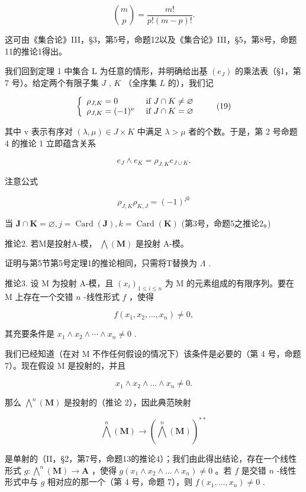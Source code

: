 \[
\binom {m} {p} = \frac {m !}{p ! (m - p) !}.
\]

这可由《集合论》III，§3，第5号，命题12以及《集合论》III，§5，第8号，命题11的推论1得出。

我们回到定理 1 中集合 L 为任意的情形，并明确给出基 \((e_{J})\) 的乘法表（§1，第 7 号）。给定两个有限子集 \(J\) , \(K\) （全序集 \(L\) 的），我们记

\[
\left\{ \begin{array}{l l} \rho_ {J, K} = 0 & \text { if } J \cap K \neq \varnothing \\ \rho_ {J, K} = (- 1) ^ {\nu} & \text { if } J \cap K = \varnothing \end{array} \right.\tag{19}
\]

其中 v 表示有序对 \((\lambda, \mu) \in J \times K\) 中满足 \(\lambda > \mu\) 者的个数。于是，第 2 号命题 4 的推论 1 立即蕴含关系

\[
e _ {J} \wedge e _ {K} = \rho_ {J, K} e _ {J \cup K}.\tag{20}
\]

注意公式

\[
\rho_ {J, K} \rho_ {K, J} = (- 1) ^ {j k}\tag{21}
\]

当 \(\mathbf{J} \cap \mathbf{K} = \varnothing, j = \operatorname{Card}(\mathbf{J}), k = \operatorname{Card}(\mathbf{K})\) (第3号，命题5之推论2。)

推论2. 若M是投射A-模， \(\bigwedge (\mathbf{M})\) 是投射 A-模。

证明与第5节第5号定理1的推论相同，只需将T替换为 \(\Lambda\) .

推论3. 设 M 为投射 A-模，且 \((x_{i})_{1\leqslant i\leqslant n}\) 为 M 的元素组成的有限序列。要在 M 上存在一个交错 \(n\) -线性形式 \(f\) ，使得

\[
f (x _ {1}, x _ {2}, \dots , x _ {n}) \neq 0,
\]

其充要条件是 \(x_{1} \wedge x_{2} \wedge \cdots \wedge x_{n} \neq 0\) .

我们已经知道（在对 M 不作任何假设的情况下）该条件是必要的（第 4 号，命题 7）。现在假设 M 是投射的，并且

\[
x _ {1} \wedge x _ {2} \wedge \dots \wedge x _ {n} \neq 0.
\]

那么 \(\bigwedge^n (\mathbf{M})\) 是投射的（推论 2），因此典范映射

\[
\bigwedge^ {n} (\mathbf {M}) \rightarrow (\bigwedge^ {n} (\mathbf {M})) ^ {* *}
\]

是单射的（II，§2，第7号，命题13的推论4）；我们由此得出结论，存在一个线性形式 \(g: \bigwedge^{n}(\mathbf{M}) \to \mathbf{A}\) ，使得 \(g(x_{1} \wedge x_{2} \wedge \dots \wedge x_{n}) \neq 0\) 。若 \(f\) 是交错 \(n\) -线性形式中与 \(g\) 相对应的那一个（第 4 号，命题 7），则 \(f(x_{1}, \ldots, x_{n}) \neq 0\) .

